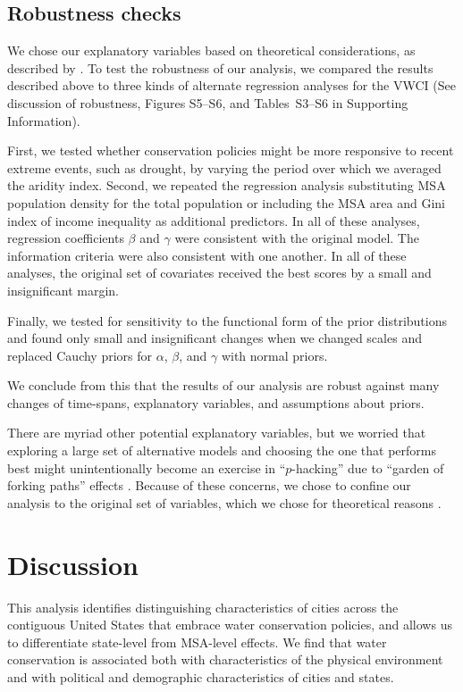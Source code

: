 \documentclass[draft,linenumbers]{agujournal}
\begin{document}
\subsection{Robustness checks}
We chose our explanatory variables based on theoretical considerations, as
described by \citet{hess:drought:2016}. To test the robustness of our analysis,
we compared the results described above to three kinds of alternate regression
analyses for the VWCI
(See discussion of robustness, Figures S5--S6, and Tables~S3--S6
in Supporting Information).

First, we tested whether conservation policies might be more
responsive to recent extreme events, such as drought, by varying the
period over which we averaged the aridity index.
Second, we repeated the regression analysis substituting MSA population density
for the total population or including the MSA area and Gini index of income
inequality as additional predictors.
In all of these analyses, regression coefficients $\beta$ and $\gamma$
were consistent with the original model.
The information criteria were also consistent with one another.
In all of these analyses, the original set of covariates received the best
scores by a small and insignificant margin.

Finally, we tested for sensitivity to the functional form of the prior
distributions and found only small and insignificant changes when we
changed scales and replaced Cauchy priors for $\alpha$, $\beta$, and
$\gamma$ with normal priors.

We conclude from this that the results of our analysis are robust against
many changes of time-spans, explanatory variables, and assumptions about priors.

There are myriad other potential explanatory variables,
but we worried that exploring a large set of alternative models
and choosing the one that performs best might
unintentionally become an exercise in ``$p$-hacking'' due to
``garden of forking paths'' effects \citep{gelman:forking.paths:2014}.
Because of these concerns, we chose to confine our analysis to the original set
of variables, which we chose for theoretical reasons
\citep{hess:drought:2016}.

\section{Discussion}

This analysis identifies distinguishing characteristics of cities across the
contiguous United States that embrace water conservation policies, and allows us
to differentiate state-level from MSA-level effects. We find that water
conservation is associated both with characteristics of the physical environment
and with political and demographic
characteristics of cities and states.
\end{document}
